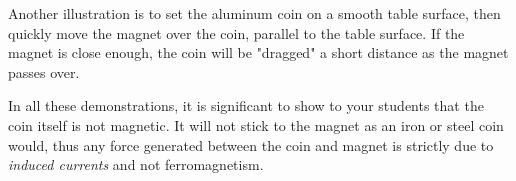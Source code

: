 Another illustration is to set the aluminum coin on a smooth table surface, then quickly move the magnet over the coin, parallel to the table surface.  If the magnet is close enough, the coin will be "dragged" a short distance as the magnet passes over.

In all these demonstrations, it is significant to show to your students that the coin itself is not magnetic.  It will not stick to the magnet as an iron or steel coin would, thus any force generated between the coin and magnet is strictly due to {\it induced currents} and not ferromagnetism.




